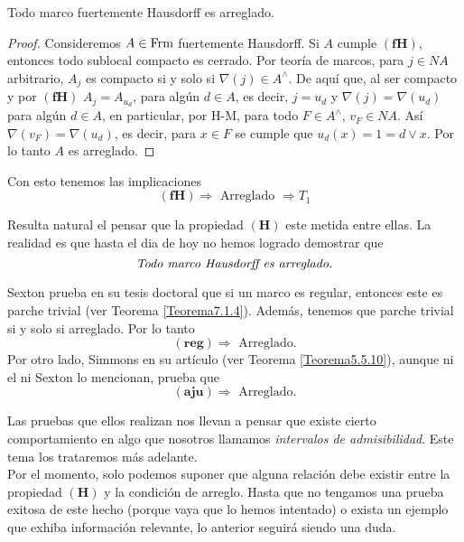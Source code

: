 \begin{lem}\label{TadyFHausdorff}
    Todo marco fuertemente Hausdorff es arreglado.
\end{lem}

\begin{proof}
    Consideremos $A\in \mathrm{Frm}$ fuertemente Hausdorff. Si $A$ cumple $\mathbf{(fH)}$, entonces todo sublocal compacto es cerrado. Por teoría de marcos, para $j\in NA$ arbitrario, $A_j$ es compacto si y solo si $\nabla(j)\in A^\wedge$. De aquí que, al ser compacto y por $\mathbf{(fH)}$ $A_j=A_{u_d}$, para algún $d\in A$, es decir, $j=u_d$ y $\nabla(j)=\nabla(u_d)$ para algún $d\in A$, en particular, por H-M, para todo $F\in A^\wedge$, $v_F\in NA$. Así $\nabla(v_F)=\nabla(u_d)$, es decir, para $x\in F$ se cumple que $u_d(x)=1=d\vee x$. Por lo tanto $A$ es arreglado.
\end{proof}

Con esto tenemos las implicaciones
\[
\mathbf{(fH)} \Rightarrow \mbox{ Arreglado }\Rightarrow T_1
\]

Resulta natural el pensar que la propiedad $\mathbf{(H)}$ este metida entre ellas. La realidad es que hasta el dia de hoy no hemos logrado demostrar que 
\[
\mbox{\emph{Todo marco Hausdorff es arreglado.}}
\]

\begin{obs}\label{Relacion arreglado}
Sexton prueba en su tesis doctoral que si un marco es regular, entonces este es parche trivial (ver Teorema \ref{Teorema7.1.4}). Además, tenemos que parche trivial si y solo si arreglado. Por lo tanto
\[
\mathbf{(reg)}\Rightarrow \mbox{ Arreglado.}
\] 
Por otro lado, Simmons en su artículo \cite{H.S.R} (ver Teorema \ref{Teorema5.5.10}), aunque ni el ni Sexton lo mencionan, prueba que 
\[
\mathbf{(aju)}\Rightarrow \mbox{ Arreglado.}
\]
\end{obs}

Las pruebas que ellos realizan nos llevan a pensar que existe cierto comportamiento en algo que nosotros llamamos \emph{intervalos de admisibilidad}. Este tema los trataremos más adelante.\\

Por el momento, solo podemos suponer que alguna relación debe existir entre la propiedad $\mathbf{(H)}$ y la condición de arreglo. Hasta que no tengamos una prueba exitosa de este hecho (porque vaya que lo hemos intentado) o exista un ejemplo que exhiba información relevante,
lo anterior seguirá siendo una duda.\\

